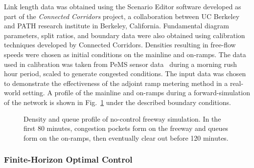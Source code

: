 Link length data was obtained using the Scenario Editor software developed
as part of the \textit{Connected Corridors} project, a collaboration between
UC Berkeley and PATH research institute in Berkeley, California.
Fundamental diagram parameters, split ratios, and boundary data were
also obtained using calibration techniques developed by Connected
Corridors. Densities resulting in free-flow speeds were chosen as
initial conditions on the mainline and on-ramps. The data used in calibration
was taken from PeMS sensor data~\cite{Chen2003} during a morning rush hour period,
scaled to generate congested conditions. The input data was chosen
to demonstrate the effectiveness of the adjoint ramp metering method
in a real-world setting. A profile of the mainline and on-ramps during
a forward-simulation of the network is shown in Fig.~\ref{fig:Density-and-queue}
under the described boundary conditions.
\begin{figure}
\hfill{}%
%								
\caption{Density and queue profile of no-control freeway simulation. In the
	first 80 minutes, congestion pockets form on the freeway and queues
	form on the on-ramps, then eventually clear out before 120 minutes.\label{fig:Density-and-queue}}
\end{figure}						
						
\subsubsection{Finite-Horizon Optimal Control\label{sub:Finite-horizon-optimal-control}}
						
